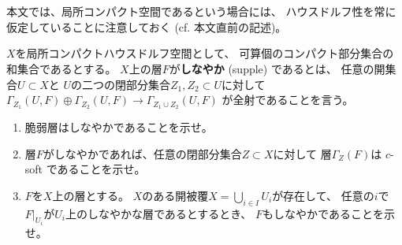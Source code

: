 \documentclass[uplatex,dvipdfmx]{jsarticle}
\begin{document}
\maketitle
\HeaderCommentA
\section{}

本文では、局所コンパクト空間であるという場合には、
ハウスドルフ性を常に仮定していることに注意しておく
(cf. 本文\cite[Proposition 2.5.1]{kashiwara2002sheaves}直前の記述)。
\fi


\begin{prob}\label{2.8}
  \(X\)を局所コンパクトハウスドルフ空間として、
  可算個のコンパクト部分集合の和集合であるとする。
  \(X\)上の層\(F\)が\textbf{しなやか} (supple) であるとは、
  任意の開集合\(U\subset X\)と
  \(U\)の二つの閉部分集合\(Z_1,Z_2\subset U\)に対して
  \(\Gamma_{Z_1}(U,F) \oplus \Gamma_{Z_2}(U,F) \to \Gamma_{Z_1\cup Z_2}(U,F)\)
  が全射であることを言う。
  \begin{enumerate}
    \item \label{2.8.1}
    脆弱層はしなやかであることを示せ。
    \item \label{2.8.2}
    層\(F\)がしなやかであれば、任意の閉部分集合\(Z\subset X\)に対して
    層\(\Gamma_Z(F)\)は \(c\)-soft であることを示せ。
    \item \label{2.8.3}
    \(F\)を\(X\)上の層とする。
    \(X\)のある開被覆\(X=\bigcup_{i\in I}U_i\)が存在して、
    任意の\(i\)で\(F|_{U_i}\)が\(U_i\)上のしなやかな層であるとするとき、
    \(F\)もしなやかであることを示せ。
  \end{enumerate}
\end{prob}
\end{document}
